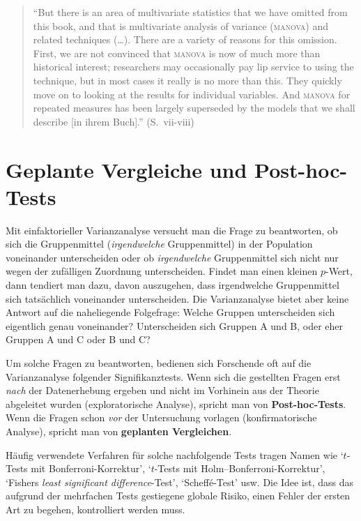 \documentclass[oneside, 10pt]{book}\usepackage[]{graphicx}\usepackage[]{xcolor}
\begin{document}
\begin{quote}
``But there is an area of multivariate statistics that we have omitted
from this book, and that is multivariate analysis of variance (\textsc{manova})
and related techniques (\dots). There are a variety of reasons for this omission. First,
we are not convinced that \textsc{manova} is now of much more than historical
interest; researchers may occasionally pay lip service to using
the technique, but in most cases it really is no more than this.
They quickly move on to looking at the results for individual variables.
And \textsc{manova} for repeated measures has been largely superseded by the
models that we shall describe [in ihrem Buch].'' (S.~vii-viii)
\end{quote}

\section{Geplante Vergleiche und Post-hoc-Tests}
Mit einfaktorieller Varianzanalyse versucht man die Frage
zu beantworten, ob sich die Gruppenmittel (\emph{irgendwelche}
Gruppenmittel) in der Population voneinander
unterscheiden oder ob \emph{irgendwelche} Gruppenmittel
sich nicht nur wegen der zufälligen Zuordnung unterscheiden.
Findet man einen
kleinen $p$-Wert, dann tendiert man dazu, davon auszugehen,
dass irgendwelche Gruppenmittel sich tatsächlich voneinander
unterscheiden. Die Varianzanalyse bietet aber keine
Antwort auf die naheliegende Folgefrage: Welche Gruppen
unterscheiden sich eigentlich genau voneinander?
Unterscheiden sich Gruppen A und B, oder eher Gruppen A und C
oder B und C?

Um solche Fragen zu beantworten, bedienen sich Forschende
oft auf die Varianzanalyse folgender Signifikanztests.
Wenn sich die gestellten Fragen erst \emph{nach} der
Daten\-erhebung ergeben und nicht im Vorhinein aus der
Theorie abgeleitet wurden (exploratorische Analyse),
spricht man von \textbf{Post-hoc-Tests}. Wenn die
Fragen schon \emph{vor} der Untersuchung vorlagen
(konfirmatorische Analyse), spricht man von
\textbf{geplanten Vergleichen}.

Häufig verwendete Verfahren für solche nachfolgende Tests
tragen Namen wie `$t$-Tests mit Bonferroni-Korrektur',
`$t$-Tests mit Holm--Bonferroni-Korrektur',
`Fishers \textit{least significant difference}-Test',
`Scheffé-Test' usw. Die Idee ist, dass das aufgrund
der mehrfachen Tests gestiegene globale Risiko,
einen Fehler der ersten Art zu begehen, kontrolliert
werden muss.
\end{document}
